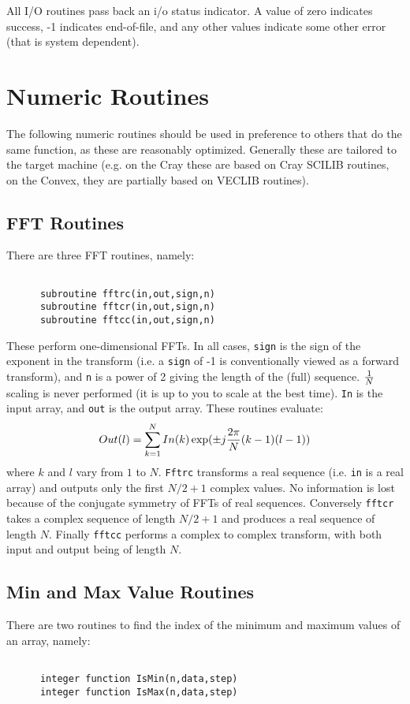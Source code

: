 \documentclass{report}
\begin{document}
All I/O routines pass back an i/o status indicator. A value of zero
indicates success, -1 indicates end-of-file, and any other values indicate
some other error (that is system dependent).

\section{Numeric Routines}
The following numeric routines should be used in preference to others that do
the same function, as these are reasonably optimized. Generally these are
tailored to the target machine (e.g. on the Cray these are
based on Cray SCILIB routines, on the Convex, they are partially based
on VECLIB routines).
\subsection{FFT Routines}
There are three FFT routines, namely:
\begin{verbatim}

      subroutine fftrc(in,out,sign,n)
      subroutine fftcr(in,out,sign,n)
      subroutine fftcc(in,out,sign,n)

\end{verbatim}
These perform one-dimensional FFTs. In all cases, {\tt sign} is the sign
of the exponent in the transform (i.e. a {\tt sign} of -1 is conventionally
viewed as a forward transform), and {\tt n} is a power of 2 giving the
length of the (full) sequence. ${1\over N}$ scaling is never performed
(it is up to you to scale at the best time). {\tt In} is the input
array, and {\tt out} is the output array. These routines
evaluate:
\[
Out(l)=\sum_{k=1}^N In(k)\exp(\pm j {2\pi\over N} (k-1)(l-1))
\]
where $k$ and $l$ vary from $1$ to $N$.
{\tt Fftrc} transforms a real
sequence (i.e. {\tt in} is a real array) and outputs only the first $N/2 + 1$
complex values. No information is lost because of the conjugate
symmetry of FFTs of real sequences. Conversely {\tt fftcr} takes a
complex sequence of length $N/2+1$ and produces a real sequence of length $N$.
Finally {\tt fftcc} performs a complex to complex transform, with
both input and output being of length $N$.

\subsection{Min and Max Value Routines}
There are two routines to find the index of the minimum and maximum values
of an array, namely:
\begin{verbatim}

      integer function IsMin(n,data,step)
      integer function IsMax(n,data,step)

\end{verbatim}
\end{document}
